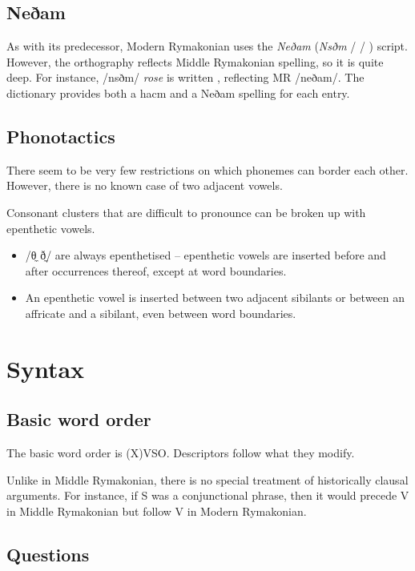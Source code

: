 \documentclass{book}
\newcommand{\lname}{Modern Rymakonian}
\begin{document}
\section{Neðam}

As with its predecessor, \lname{} uses the \emph{Neðam} (\emph{Nsðm} /  / ) script. However, the orthography reflects Middle Rymakonian spelling, so it is quite deep. For instance,  /nsðm/ \emph{rose} is written , reflecting MR  /neðam/. The dictionary provides both a hacm and a Neðam spelling for each entry.

\section{Phonotactics}

There seem to be very few restrictions on which phonemes can border each other. However, there is no known case of two adjacent vowels.

Consonant clusters that are difficult to pronounce can be broken up with epenthetic vowels.

\begin{itemize}
  \item /θ̼ ð̼/ are always epenthetised -- epenthetic vowels are inserted before and after occurrences thereof, except at word boundaries.
  \item An epenthetic vowel is inserted between two adjacent sibilants or between an affricate and a sibilant, even between word boundaries.
\end{itemize}

\chapter{Syntax}

\section{Basic word order}

The basic word order is (X)VSO. Descriptors follow what they modify.

Unlike in Middle Rymakonian, there is no special treatment of historically clausal arguments. For instance, if S was a conjunctional phrase, then it would precede V in Middle Rymakonian but follow V in Modern Rymakonian.

\section{Questions}
\end{document}
